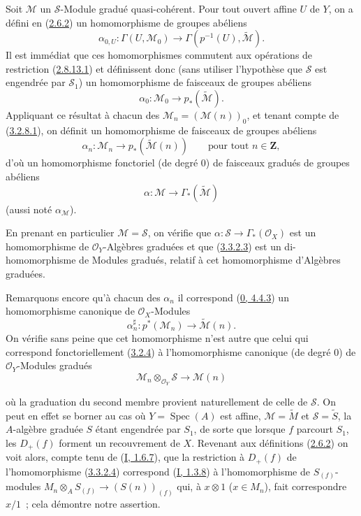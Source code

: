 \begin{env}[3.3.2]
\label{II.3.3.2-fr}
Soit $\mathcal{M}$ un $\mathcal{S}$-Module gradué quasi-cohérent. Pour tout
ouvert affine $U$ de $Y$, on a défini en
(\hyperref[II.2.6.2-fr]{2.6.2}) un homomorphisme de groupes abéliens
\[
  \alpha_{0,U}:\Gamma(U,\mathcal{M}_0)
  \longrightarrow\Gamma(p^{-1}(U),\widetilde{\mathcal{M}}).
\]
Il est immédiat que ces homomorphismes commutent aux opérations de restriction
(\hyperref[II.2.8.13.1-fr]{2.8.13.1}) et définissent donc (sans utiliser
l'hypothèse que $\mathcal{S}$ est engendrée par $\mathcal{S}_1$) un
homomorphisme de faisceaux de groupes abéliens
\[
\label{II.3.3.2.1-fr}
  \alpha_0:\mathcal{M}_0\longrightarrow p_*(\widetilde{\mathcal{M}}).
\tag{3.3.2.1}
\]
Appliquant ce résultat à chacun des
$\mathcal{M}_n=(\mathcal{M}(n))_0$, et tenant compte de
(\hyperref[II.3.2.8.1-fr]{3.2.8.1}), on définit un homomorphisme de faisceaux
de groupes abéliens
\[
\label{II.3.3.2.2-fr}
  \alpha_n:\mathcal{M}_n\longrightarrow
  p_*(\widetilde{\mathcal{M}}(n))
  \qquad\text{pour tout }n\in\mathbf{Z},
\tag{3.3.2.2}
\]
d'où un homomorphisme fonctoriel (de degré $0$) de faisceaux gradués de groupes
abéliens
\[
\label{II.3.3.2.3-fr}
  \alpha:\mathcal{M}\longrightarrow\Gamma_*(\widetilde{\mathcal{M}})
\tag{3.3.2.3}
\]
(aussi noté $\alpha_{\mathcal{M}}$).

En prenant en particulier $\mathcal{M}=\mathcal{S}$, on vérifie que
$\alpha:\mathcal{S}\to\Gamma_*(\mathcal{O}_X)$ est un homomorphisme de
$\mathcal{O}_Y$-Algèbres graduées et que
(\hyperref[II.3.3.2.3-fr]{3.3.2.3}) est un di-homomorphisme de Modules
gradués, relatif à cet homomorphisme d'Algèbres graduées.

Remarquons encore qu'à chacun des $\alpha_n$ il correspond
(\hyperref[0.4.4.3-fr]{0, 4.4.3}) un homomorphisme canonique de
$\mathcal{O}_X$-Modules
\[
\label{II.3.3.2.4-fr}
  \alpha_n^\sharp:p^*(\mathcal{M}_n)
  \longrightarrow\widetilde{\mathcal{M}}(n).
\tag{3.3.2.4}
\]
On vérifie sans peine que cet homomorphisme n'est autre que celui qui
correspond fonctoriellement (\hyperref[II.3.2.4-fr]{3.2.4}) à
l'homomorphisme canonique (de degré $0$) de $\mathcal{O}_Y$-Modules gradués
\[
\label{II.3.3.2.5-fr}
  \mathcal{M}_n\otimes_{\mathcal{O}_Y}\mathcal{S}
  \longrightarrow\mathcal{M}(n)
\tag{3.3.2.5}
\]


où la graduation du second membre provient naturellement de celle de
$\mathcal{S}$. On peut en effet se borner au cas où
$Y=\operatorname{Spec}(A)$ est affine, $\mathcal{M}=\widetilde{M}$ et
$\mathcal{S}=\widetilde{S}$, la $A$-algèbre graduée $S$ étant engendrée par
$S_1$, de sorte que lorsque $f$ parcourt $S_1$, les $D_+(f)$ forment un
recouvrement de $X$. Revenant aux définitions
(\hyperref[II.2.6.2-fr]{2.6.2}) on voit alors, compte tenu de
(\hyperref[I.1.6.7-fr]{I, 1.6.7}), que la restriction à $D_+(f)$ de
l'homomorphisme (\hyperref[II.3.3.2.4-fr]{3.3.2.4}) correspond
(\hyperref[I.1.3.8-fr]{I, 1.3.8}) à l'homomorphisme de $S_{(f)}$-modules
$M_n\otimes_A S_{(f)}\to(S(n))_{(f)}$ qui, à $x\otimes1$ ($x\in M_n$), fait
correspondre $x/1$~; cela démontre notre assertion.
\end{env}

